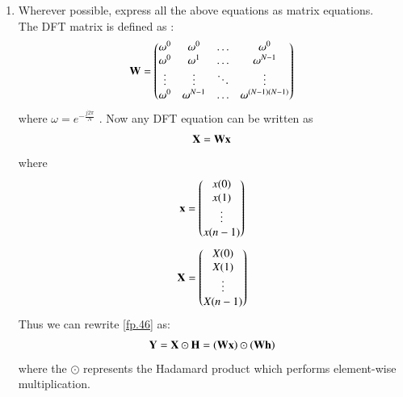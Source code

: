 \documentclass[journal,12pt,twocolumn]{IEEEtran}
\theoremstyle{remark}
\begin{document}
\begin{enumerate}
\item Wherever possible, express all the above equations as matrix equations.\\
\solution The DFT matrix is defined as : 
\begin{align}
	\mathbf{W} = 
	\begin{pmatrix}
		\omega^0 & \omega^0 & \ldots & \omega^0 \\
		\omega^0 & \omega^1 & \ldots & \omega^{N - 1} \\
		\vdots & \vdots & \ddots & \vdots \\
		\omega^0 & \omega^{N - 1} & \ldots & \omega^{(N -1)(N - 1)}
	\end{pmatrix}
\end{align}
where $\omega=e^{-\frac{j2\pi}{N}}$ . Now any DFT equation can be written as
\begin{align}
    \mathbf{X} = \mathbf{W}\mathbf{x}
\end{align}
\noindent where
\begin{align}
	\mathbf{x} = 
	\begin{pmatrix}
		x(0) \\ x(1) \\ \vdots \\ x(n - 1)
	\end{pmatrix}
\end{align}
\begin{align}
	\mathbf{X} = 
	\begin{pmatrix}
		X(0) \\ X(1) \\ \vdots \\ X(n - 1)
	\end{pmatrix}
\end{align}
Thus we can rewrite  \eqref{fp.46} as:
\begin{align}
	\mathbf{Y} = \mathbf{X}\odot\mathbf{H} = \left(\mathbf{W}\mathbf{x}\right)\odot\left(\mathbf{W}\mathbf{h}\right)
\end{align}
where the $\odot$ represents the Hadamard product which performs element-wise multiplication.
\end{enumerate}
\end{document}
